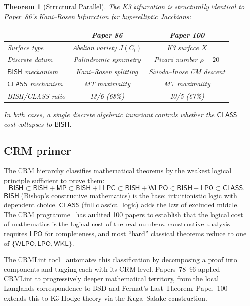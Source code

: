 \documentclass[11pt,a4paper]{article}
\theoremstyle{plain}
\newtheorem{theorem}{Theorem}[section]
\theoremstyle{definition}
\newcommand{\BISH}{\textsf{BISH}}
\newcommand{\WKL}{\textsf{WKL}}
\newcommand{\WLPO}{\textsf{WLPO}}
\newcommand{\LLPO}{\textsf{LLPO}}
\newcommand{\LPO}{\textsf{LPO}}
\newcommand{\MP}{\textsf{MP}}
\newcommand{\CLASS}{\textsf{CLASS}}
\begin{document}
\begin{theorem}[Structural Parallel]\label{thm:C}
The K3 bifurcation is structurally identical to Paper~86's Kani--Rosen bifurcation for hyperelliptic Jacobians:
\begin{center}
\begin{tabular}{lcc}
\toprule
& \textbf{Paper 86} & \textbf{Paper 100} \\
\midrule
Surface type & Abelian variety $J(C_t)$ & K3 surface $X$ \\
Discrete datum & Palindromic symmetry & Picard number $\rho = 20$ \\
$\BISH$ mechanism & Kani--Rosen splitting & Shioda--Inose CM descent \\
$\CLASS$ mechanism & MT maximality & MT maximality \\
BISH/CLASS ratio & 13/6 (68\%) & 10/5 (67\%) \\
\bottomrule
\end{tabular}
\end{center}
In both cases, a single discrete algebraic invariant controls whether the $\CLASS$ cost collapses to $\BISH$.
\end{theorem}

\subsection{CRM primer}\label{sec:crm-primer}

The CRM hierarchy classifies mathematical theorems by the weakest logical principle sufficient to prove them:
\[
\BISH \subset \BISH{+}\MP \subset \BISH{+}\LLPO \subset \BISH{+}\WLPO \subset \BISH{+}\LPO \subset \CLASS.
\]
$\BISH$ (Bishop's constructive mathematics) is the base: intuitionistic logic with dependent choice. $\CLASS$ (full classical logic) adds the law of excluded middle. The CRM programme~\cite{lee-format-guide} has audited 100 papers to establish that the logical cost of mathematics is the logical cost of the real numbers: constructive analysis requires $\LPO$ for completeness, and most ``hard'' classical theorems reduce to one of $\{\WLPO, \LPO, \WKL\}$.

The CRMLint tool~\cite{lee-p76} automates this classification by decomposing a proof into components and tagging each with its CRM level. Papers~78--96 applied CRMLint to progressively deeper mathematical territory, from the local Langlands correspondence to BSD and Fermat's Last Theorem. Paper~100 extends this to K3 Hodge theory via the Kuga--Satake construction.
\end{document}
